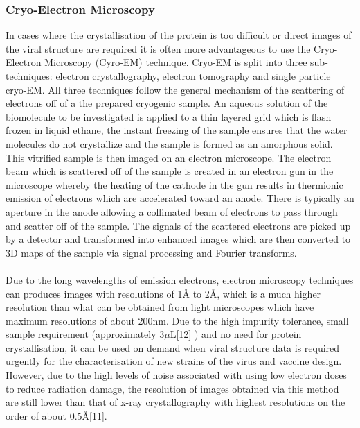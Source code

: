 \documentclass[11pt]{report}
\begin{document}
\subsubsection{Cryo-Electron Microscopy}
In cases where the crystallisation of the protein is too difficult or direct images of the viral structure are required it is often more advantageous to use the Cryo-Electron Microscopy (Cyro-EM) technique. Cryo-EM is split into three sub-techniques: electron crystallography, electron tomography and single particle cryo-EM. All three techniques follow the general mechanism of the scattering of electrons off of a the prepared cryogenic sample. An aqueous solution of the biomolecule to be investigated is applied to a thin layered grid which is flash frozen in liquid ethane, the instant freezing of the sample ensures that the water molecules do not crystallize and the sample is formed as an amorphous solid. This vitrified sample is then imaged on an electron microscope. The electron beam which is scattered off of the sample is created in an electron gun in the microscope whereby the heating of the cathode in the gun results in thermionic emission of electrons which are accelerated toward an anode. There is typically an aperture in the anode allowing a collimated beam of electrons to pass through and scatter off of the sample. The signals of the scattered electrons are picked up by a detector and transformed into enhanced images which are then converted to 3D maps of the sample via signal processing and Fourier transforms.
\\
\\
Due to the long wavelengths of emission electrons, electron microscopy techniques can produces images with resolutions of 1Å to 2Å, which is a much higher resolution than what can be obtained from light microscopes which have maximum resolutions of about 200nm. Due to the high impurity tolerance, small sample requirement (approximately 3$\mu$L[12] ) and no need for protein crystallisation, it can be used on demand when viral structure data is required urgently for the characterisation of new strains of the virus and vaccine design. However, due to the high levels of noise associated with using low electron doses to reduce radiation damage, the resolution of images obtained via this method are still lower than that of x-ray crystallography with highest resolutions on the order of about 0.5Å[11].  
\end{document}
